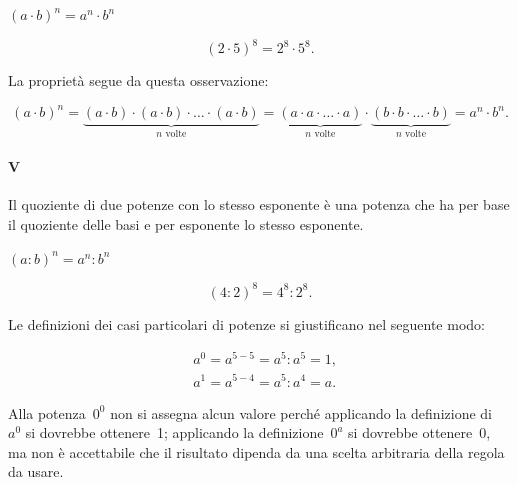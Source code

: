 \begin{minipage}[t]{.45\textwidth}
\centering
\vspace{4mm}
  \(\boxed{(a\cdot b)^n=a^n\cdot b^n}\)
\end{minipage}\hfil
\begin{minipage}[t]{.45\textwidth}
\centering
\[(2\cdot 5)^8=2^8\cdot 5^8. \]
\end{minipage}
\vspace{.5cm}

La proprietà segue da questa osservazione:
\begin{inaccessibleblock}
\[(a\cdot b)^n=\underbrace{(a\cdot b)\cdot(a\cdot b)\cdot\ldots\cdot(a\cdot 
b)}_{n\text{ volte}}%
   =\underbrace{(a\cdot a\cdot\ldots\cdot a)}_{n\text{ volte}}\cdot%
   \underbrace{(b\cdot b\cdot\ldots\cdot b)}_{n\text{ volte}}%
   =a^n\cdot b^n.\]
\end{inaccessibleblock}

\paragraph{V} Il quoziente di due potenze con lo stesso esponente è
una potenza che ha per base il quoziente delle basi e per esponente lo 
stesso esponente.

\begin{minipage}[t]{.45\textwidth}
\centering
\vspace{4mm}
  \(\boxed{(a:b)^n=a^n:b^n}\)
\end{minipage}\hfil
\begin{minipage}[t]{.45\textwidth}
\centering
\[(4:2)^8=4^8:2^8. \]
\end{minipage}
\vspace{.5cm}

Le definizioni dei casi particolari di potenze si giustificano nel seguente 
modo:

\begin{align*}
 &a^0=a^{5-5}=a^5:a^5=1,\\
 &a^1=a^{5-4}=a^5:a^4=a.
\end{align*}

Alla potenza~\(0^0\) non si assegna alcun valore perché applicando la 
definizione di~\(a^0\) si dovrebbe ottenere~1;
applicando la definizione~\(0^a\) si dovrebbe ottenere~0, 
ma non è accettabile che il risultato dipenda da una scelta arbitraria 
della regola da usare.


